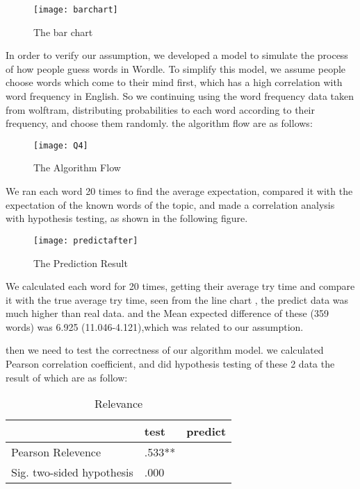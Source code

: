 \documentclass{mcmthesis}
\begin{document}
\begin{figure}[h]
\small
\centering
\texttt{[image: barchart]}
\caption{The bar chart} \label{fig:aa}
\end{figure}

In order to verify our assumption, we developed a model  to simulate the process of how people guess words  in Wordle.  To simplify this model, we assume people choose words which come to their mind first, which has a high correlation with word frequency in English. So we continuing using the word frequency data taken from wolftram, distributing probabilities to each word according to their frequency, and choose them randomly. the algorithm flow are as follows:

\begin{figure}[h]
\small
\centering
\texttt{[image: Q4]}
\caption{The Algorithm Flow} \label{fig:aa}
\end{figure}

We ran each word 20 times to find the average expectation, compared it with the expectation of the known words of the topic, and made a correlation analysis with
hypothesis testing, as shown in the following figure.

\begin{figure}[h]
\small
\centering
\texttt{[image: predictafter]}
\caption{The Prediction Result} \label{fig:aa}
\end{figure}

We calculated each word for 20 times, getting their average try time and compare it with the true average try time, seen from the line chart , the predict data was much higher than real data. and the Mean expected difference of these (359 words) was 6.925 (11.046-4.121),which was related to our assumption.

then we need to test the correctness of our algorithm model. we calculated Pearson correlation coefficient, and did hypothesis testing of these 2 data the result of which are as follow:


\begin{longtable}{ p{14em} p{4em} p{4em} }
\caption{Relevance}
\label{tb:longtable}\\
\toprule
 & test & predict \\
\midrule
Pearson Relevence & .533** & \centering 1\\
\midrule
Sig. two-sided hypothesis &  .000 & \\
\bottomrule
\end{longtable}
\end{document}

